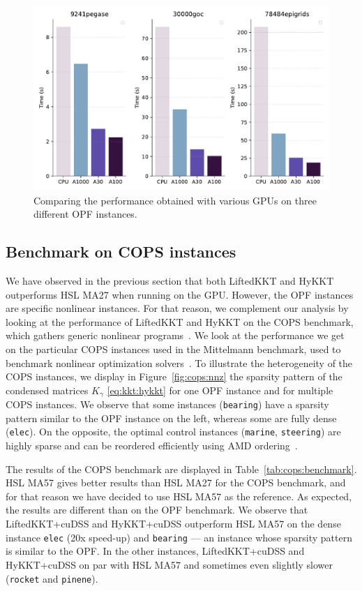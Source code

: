 \begin{figure}[!ht]
  \centering
  \includegraphics[width=.6\textwidth]{../figures/benchmark_gpus.pdf}
  \caption{Comparing the performance obtained with various GPUs
    on three different OPF instances.
  \label{fig:gpubench}}
\end{figure}


\subsection{Benchmark on COPS instances}
\label{sec:num:cops}
We have observed in the previous section that both LiftedKKT
and HyKKT outperforms HSL MA27 when running on the GPU.
However, the OPF instances are specific nonlinear instances.
For that reason, we complement our analysis by looking
at the performance of LiftedKKT and HyKKT on the COPS benchmark,
which gathers generic nonlinear programs~\cite{dolan2004benchmarking}.
We look at the performance we get on the particular COPS instances used in
the Mittelmann benchmark, used to benchmark nonlinear optimization
solvers~\cite{mittelmann2002benchmark}.
To illustrate the heterogeneity of the COPS instances,
we display in Figure~\ref{fig:cops:nnz} the sparsity pattern of the
condensed matrices $K_\gamma$ \eqref{eq:kkt:hykkt} for one OPF instance and for multiple
COPS instances. We observe that some instances ({\tt bearing}) have a sparsity pattern
similar to the OPF instance on the left, whereas some are fully dense ({\tt elec}).
On the opposite, the optimal control instances ({\tt marine}, {\tt steering}) are
highly sparse and can be reordered efficiently using AMD ordering~\cite{amestoy-david-duff-2004}.

The results of the COPS benchmark are displayed in Table~\ref{tab:cops:benchmark}.
HSL MA57 gives better results than HSL MA27 for the COPS benchmark, and
for that reason we have decided to use HSL MA57 as the reference.  As expected,
the results are different than on the OPF benchmark.
We observe that LiftedKKT+cuDSS and HyKKT+cuDSS outperform HSL MA57 on the dense instance {\tt elec}
(20x speed-up) and {\tt bearing}  --- an instance whose sparsity pattern
is similar to the OPF. In the other instances, LiftedKKT+cuDSS and HyKKT+cuDSS
on par with HSL MA57 and sometimes even slightly slower ({\tt rocket} and {\tt pinene}).


